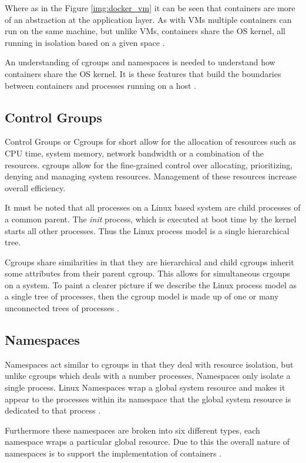 Where as in the Figure \ref{img:docker_vm} it can be seen that containers are more of an abstraction at the application layer. As with VMs multiple containers can run on the same machine, but unlike VMs, containers share the OS kernel, all running in isolation based on a given space \citep{docker_2018}. 

An understanding of cgroups and namespaces is needed to understand how containers share the OS kernel. It is these features that build the boundaries between containers and processes running on a host \citep{yegulalp_2018}. 

\subsection{Control Groups}
\label{sub:cgroups}

Control Groups or Cgroups for short allow for the allocation of resources such as CPU time, system memory, network bandwidth or a combination of the resources. cgroups allow for the fine-grained control over allocating, prioritizing, denying and managing system resources. Management of these resources increase overall efficiency.

It must be noted that all processes on a Linux based system are child processes of a common parent. The \textit{init} process, which is executed at boot time by the kernel starts all other processes. Thus the Linux process model is a single hierarchical tree. 

Cgroups share similarities in that they are hierarchical and child cgroups inherit some attributes from their parent cgroup. This allows for simultaneous crgoups on a system. To paint a clearer picture if we describe the Linux process model as a single tree of processes, then the cgroup model is made up of one or many unconnected trees of processes \citep{cgroups_2018}.

\subsection{Namespaces}

Namespaces act similar to cgroups in that they deal with resource isolation, but unlike cgroups which deals with a number processes, Namespaces only isolate a single process. Linux Namespaces wrap a global system resource and makes it appear to the processes within its namespace that the global system resource is dedicated to that process \citep{namespaces}.

Furthermore these namespaces are broken into six different types, each namespace wraps a particular global resource. Due to this the overall nature of namespaces is to support the implementation of containers \citep{kerrisk_2013}.

